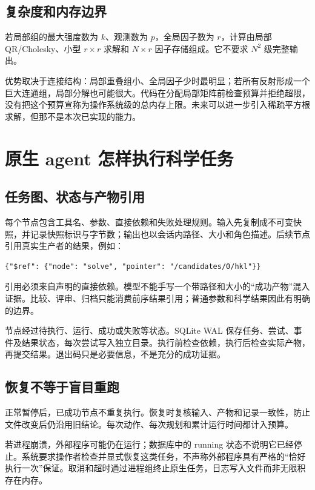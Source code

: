 \documentclass[UTF8,11pt,a4paper,fontset=fandol]{ctexart}
\begin{document}
\subsection{复杂度和内存边界}

若局部组的最大强度数为 $k$、观测数为 $p$，全局因子数为 $r$，计算由局部 QR/Cholesky、小型 $r\times r$ 求解和 $N\times r$ 因子存储组成。它不要求 $N^2$ 级完整输出。

优势取决于连接结构：局部重叠组小、全局因子少时最明显；若所有反射形成一个巨大连通组，局部分解也可能很大。代码在分配局部矩阵前检查预算并拒绝超限，没有把这个预算宣称为操作系统级的总内存上限。未来可以进一步引入稀疏平方根求解，但那不是本次已实现的能力。

\section{原生 agent 怎样执行科学任务}
\subsection{任务图、状态与产物引用}

每个节点包含工具名、参数、直接依赖和失败处理规则。输入先复制成不可变快照，并记录快照标识与字节数；输出也以会话内路径、大小和角色描述。后续节点引用真实生产者的结果，例如：
\begin{lstlisting}
{"$ref": {"node": "solve", "pointer": "/candidates/0/hkl"}}
\end{lstlisting}
引用必须来自声明的直接依赖。模型不能手写一个带路径和大小的“成功产物”混入证据。比较、评审、归档只能消费前序结果引用；普通参数和科学结果因此有明确的边界。

节点经过待执行、运行、成功或失败等状态。SQLite WAL 保存任务、尝试、事件及结果状态，每次尝试写入独立目录。执行前检查依赖，执行后检查实际产物，再提交结果。退出码只是必要信息，不是充分的成功证据。

\subsection{恢复不等于盲目重跑}

正常暂停后，已成功节点不重复执行。恢复时复核输入、产物和记录一致性，防止文件改变后仍沿用旧结论。每次动作、每次规划和累计运行时间都计入预算。

若进程崩溃，外部程序可能仍在运行；数据库中的 running 状态不说明它已经停止。系统要求操作者检查并显式恢复这类任务，不声称外部程序具有严格的“恰好执行一次”保证。取消和超时通过进程组终止原生任务，日志写入文件而非无限积存在内存。
\end{document}
